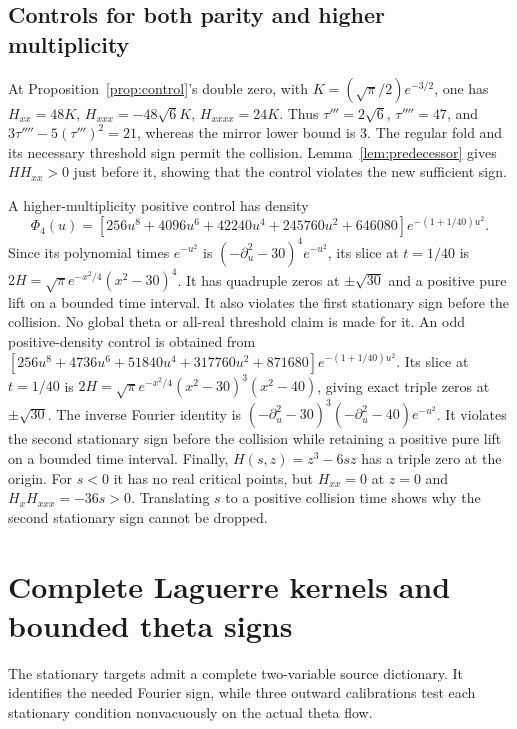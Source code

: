 \documentclass[11pt]{article}
\theoremstyle{definition}
\theoremstyle{remark}
\begin{document}
\subsection{Controls for both parity and higher multiplicity}

At Proposition~\ref{prop:control}'s double zero, with
$K=(\sqrt\pi/2)e^{-3/2}$, one has
$H_{xx}=48K$, $H_{xxx}=-48\sqrt6K$, $H_{xxxx}=24K$.
Thus $\tau'''=2\sqrt6$, $\tau''''=47$, and
$3\tau''''-5(\tau''')^2=21$, whereas the mirror lower bound is $3$.
The regular fold and its necessary threshold sign permit the collision.
Lemma~\ref{lem:predecessor} gives $HH_{xx}>0$ just before it, showing
that the control violates the new sufficient sign.

A higher-multiplicity positive control has density
\begin{equation}
 \Phi_4(u)=[256u^8+4096u^6+42240u^4+245760u^2+646080]
 e^{-(1+1/40)u^2}.
 \label{eq:quadruple-density}
\end{equation}
Since its polynomial times $e^{-u^2}$ is
$(-\partial_u^2-30)^4e^{-u^2}$, its slice at $t=1/40$ is
$2H=\sqrt\pi e^{-x^2/4}(x^2-30)^4$.
It has quadruple zeros at $\pm\sqrt{30}$ and a positive pure lift on a
bounded time interval. It also violates the first stationary sign before
the collision. No global theta or all-real threshold claim is made for it.
An odd positive-density control is obtained from
$[256u^8+4736u^6+51840u^4+317760u^2+871680]e^{-(1+1/40)u^2}$.
Its slice at $t=1/40$ is
$2H=\sqrt\pi e^{-x^2/4}(x^2-30)^3(x^2-40)$, giving exact triple
zeros at $\pm\sqrt{30}$. The inverse Fourier identity is
$(-\partial_u^2-30)^3(-\partial_u^2-40)e^{-u^2}$.
It violates the second stationary sign before the collision while
retaining a positive pure lift on a bounded time interval.
Finally, $H(s,z)=z^3-6sz$ has a triple zero at the origin. For $s<0$
it has no real critical points, but $H_{xx}=0$ at $z=0$ and
$H_xH_{xxx}=-36s>0$. Translating $s$ to a positive collision time shows
why the second stationary sign cannot be dropped.

\section{Complete Laguerre kernels and bounded theta signs}
\label{sec:theta-signs}

The stationary targets admit a complete two-variable source dictionary.
It identifies the needed Fourier sign, while three outward calibrations
test each stationary condition nonvacuously on the actual theta flow.
\end{document}
